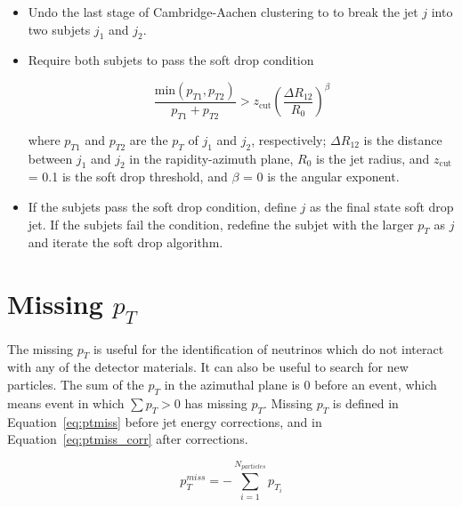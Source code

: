 
\begin{itemize}

	\item Undo the last stage of Cambridge-Aachen clustering to to break the jet $j$ into two subjets $j_1$ and $j_2$.
	\item Require both subjets to pass the soft drop condition
	
	\begin{equation}
		   \frac {\text{min}(p_{T1},p_{T2} )}{p_{T1} + p_{T2}} >   z_{\text{cut}} \left( \frac{ \Delta R_{12} }{ R_0 } \right)^{\beta}
	\end{equation}
	
	where $p_{T1}$ and $p_{T2}$ are the $p_{T}$ of $j_1$ and $j_2$, respectively; $\Delta R_{12}$ is the distance between $j_1$ and $j_2$ in the rapidity-azimuth plane, $R_0$ is the jet radius, and $z_{\text{cut}}$ = 0.1 is the soft drop threshold, and $\beta$ = 0 is the angular exponent. 
	
	\item If the subjets pass the soft drop condition, define $j$ as the final state soft drop jet. If the subjets fail the condition, redefine the subjet with the larger $p_T$ as $j$ and iterate the soft drop algorithm.
	
\end{itemize}



\section{Missing $p_T$}

The missing $p_T$ is useful for the identification of neutrinos which do not interact with any of the detector materials. It can also be useful to search for new particles. The sum of the $p_T$ in the azimuthal plane is 0 before an event, which means event in which $\sum p_{T} > 0$ has missing $p_T$. Missing $p_T$ is defined in Equation~\ref{eq:ptmiss} before jet energy corrections, and in Equation~\ref{eq:ptmiss_corr} after corrections.

\begin{equation}
	p^{miss}_{T}   = -\sum_{i=1}^{N_{particles}} p_{T_{i}}
	\label{eq:ptmiss}
\end{equation}

